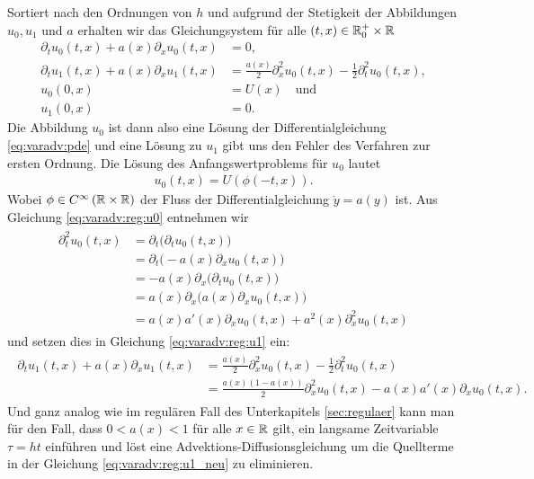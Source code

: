 Sortiert nach den Ordnungen von $h$ und aufgrund der Stetigkeit der Abbildungen
$u_0, u_1$ und $a$ erhalten wir das Gleichungsystem für alle $(t,x) \in \mathbb R^+_0
\times \mathbb R$
\begin{align}
\label{eq:varadv:reg:u0}
\partial_t u_0(t,x) + a(x) \partial_x u_0(t, x) &= 0,\\
\label{eq:varadv:reg:u1}
\partial_t u_1(t,x) + a(x) \partial_x u_1(t, x) &= \frac{a(x)}{2} \partial^2_x u_0(t,x) - \frac{1}{2} \partial^2_t u_0(t,x),\\
u_0(0,x) &= U(x) \quad \text{und}\\
u_1(0,x) &= 0.
\end{align}
Die Abbildung $u_0$ ist dann also eine Lösung der Differentialgleichung
\eqref{eq:varadv:pde} und eine Lösung zu $u_1$ gibt uns den Fehler des Verfahren
zur ersten Ordnung.
Die Lösung des Anfangswertproblems für $u_0$ lautet 
\begin{align}
\label{eq:varadv:reg:u0_loesung}
u_0(t,x) = U( \phi(-t, x) ).
\end{align}
Wobei $\phi \in C^\infty \left( \mathbb R \times \mathbb R \right)$ der Fluss der Differentialgleichung $\dot y = a(y)$ ist.
Aus Gleichung \eqref{eq:varadv:reg:u0} entnehmen wir
\begin{align}\label{eq:varadv:kleina:2teabl}
\begin{split}
\partial^2_t u_0(t,x) &= \partial_t \bigl( \partial_t u_0(t,x) \bigr)\\
&= \partial_t \bigl( - a(x) \partial_x u_0(t, x) \bigr)\\
&= - a(x) \partial_x \bigl( \partial_t u_0(t, x) \bigr)\\
&= a(x) \partial_x \bigl( a(x) \partial_x u_0(t, x) \bigr)\\
&= a(x) a'(x) \partial_x u_0(t,x) + a^2(x) \partial^2_x u_0(t,x)
\end{split}
\end{align}
und setzen dies in Gleichung \eqref{eq:varadv:reg:u1} ein:
\begin{align}\label{eq:varadv:reg:u1_neu}
\begin{split}
\partial_t u_1(t,x) + a(x) \partial_x u_1(t, x) &= \frac{a(x)}{2} \partial^2_x u_0(t,x) - \frac{1}{2} \partial^2_t u_0(t,x)\\
&= \frac{a(x)(1 - a(x) )}{2} \partial^2_x u_0(t,x) - a(x) a'(x)  \partial_x u_0(t,x).
\end{split}
\end{align}
Und ganz analog wie im regulären Fall des Unterkapitels \ref{sec:regulaer} kann man für den Fall, dass $0 < a(x) < 1$ für alle $x \in \mathbb R$ gilt, ein langsame Zeitvariable $\tau = ht$ einführen und löst eine Advektions-Diffusionsgleichung um die Quellterme in der Gleichung \eqref{eq:varadv:reg:u1_neu} zu eliminieren.
